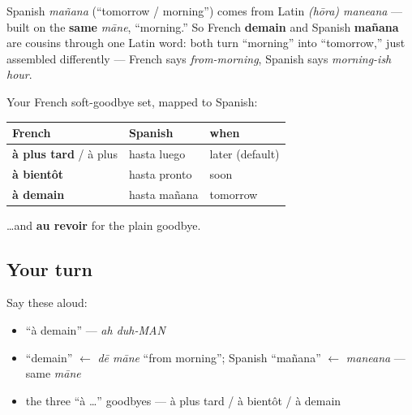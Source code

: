 \begin{culture}
Spanish \emph{mañana} (\textquotedblleft{}tomorrow / morning\textquotedblright{}) comes from Latin \emph{(hōra) maneana} — built on the \textbf{same} \emph{māne}, \textquotedblleft{}morning.\textquotedblright{} So French \textbf{demain} and Spanish \textbf{mañana} are cousins through one Latin word: both turn \textquotedblleft{}morning\textquotedblright{} into \textquotedblleft{}tomorrow,\textquotedblright{} just assembled differently — French says \emph{from-morning}, Spanish says \emph{morning-ish hour}.
\end{culture}

\begin{grammarlens}[title={Grammar Lens: the \textquotedblleft{}à …\textquotedblright{} farewells, complete}]
Your French soft-goodbye set, mapped to Spanish:

\noindent
\begin{tabularx}{\linewidth}{@{}>{\raggedright\arraybackslash}X>{\raggedright\arraybackslash}X>{\raggedright\arraybackslash}X@{}}
\toprule
\textbf{French} & \textbf{Spanish} & \textbf{when} \\
\midrule
\textbf{à plus tard} / à plus & hasta luego & later (default) \\
\textbf{à bientôt} & hasta pronto & soon \\
\textbf{à demain} & hasta mañana & tomorrow \\
\bottomrule
\end{tabularx}

…and \textbf{au revoir} for the plain goodbye.
\end{grammarlens}

\subsection*{Your turn}
Say these aloud:

\begin{itemize}
\raggedright
  \item \textquotedblleft{}à demain\textquotedblright{} — \emph{ah duh-MAN}
  \item \textquotedblleft{}demain\textquotedblright{} $\leftarrow$ \emph{dē māne} \textquotedblleft{}from morning\textquotedblright{}; Spanish \textquotedblleft{}mañana\textquotedblright{} $\leftarrow$ \emph{maneana} — same \emph{māne}
  \item the three \textquotedblleft{}à …\textquotedblright{} goodbyes — à plus tard / à bientôt / à demain
\end{itemize}

